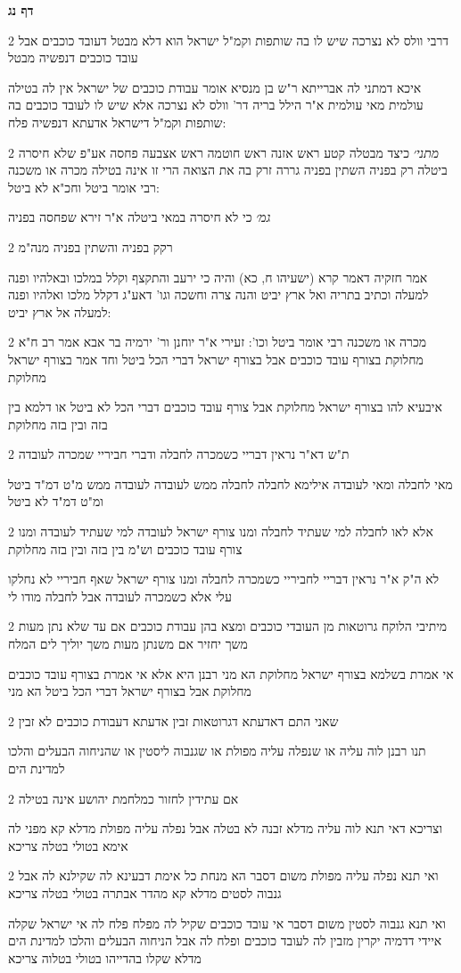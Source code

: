 \documentclass[12pt, openany]{book}
\newcommand{\sethebfont}{
\fontsize{10.5pt}{21.0pt} \selectfont
}
\newcommand{\twocol}[1]{
	{\sethebfont \begin{multicols}{2}
			#1
	\end{multicols}}	
}
\newcommand{\sectname}{}
\newcommand{\newsection}[1]{
	\addcontentsline{toc}{section}{#1}
	\renewcommand{\sectname}{#1}	
	\vspace{-\baselineskip}
	\begin{center}
		\textbf{%
\fontsize{16pt}{16pt}\selectfont
			#1}
	\end{center}
	\vspace{-\baselineskip}
	\nopagebreak
}
\begin{document}
\newsection{דף נג}
\twocol{דרבי וולס לא נצרכה שיש לו בה שותפות וקמ"ל ישראל הוא דלא מבטל דעובד כוכבים אבל עובד כוכבים דנפשיה מבטל
\par איכא דמתני לה אברייתא ר"ש בן מנסיא אומר עבודת כוכבים של ישראל אין לה בטילה עולמית מאי עולמית א"ר הילל בריה דר' וולס לא נצרכה אלא שיש לו לעובד כוכבים בה שותפות וקמ"ל דישראל אדעתא דנפשיה פלח:}
\twocol{{\large\emph{מתני׳}} כיצד מבטלה קטע ראש אזנה ראש חוטמה ראש אצבעה פחסה אע"פ שלא חיסרה ביטלה רק בפניה השתין בפניה גררה זרק בה את הצואה הרי זו אינה בטילה מכרה או משכנה רבי אומר ביטל וחכ"א לא ביטל:
\par {\large\emph{גמ׳}} כי לא חיסרה במאי ביטלה א"ר זירא שפחסה בפניה}
\twocol{רקק בפניה והשתין בפניה מנה"מ
\par אמר חזקיה דאמר קרא (ישעיהו ח, כא) והיה כי ירעב והתקצף וקלל במלכו ובאלהיו ופנה למעלה וכתיב בתריה ואל ארץ יביט והנה צרה וחשכה וגו' דאע"ג דקלל מלכו ואלהיו ופנה למעלה אל ארץ יביט:}
\twocol{מכרה או משכנה רבי אומר ביטל וכו': זעירי א"ר יוחנן ור' ירמיה בר אבא אמר רב ח"א מחלוקת בצורף עובד כוכבים אבל בצורף ישראל דברי הכל ביטל וחד אמר בצורף ישראל מחלוקת
\par איבעיא להו בצורף ישראל מחלוקת אבל צורף עובד כוכבים דברי הכל לא ביטל או דלמא בין בזה ובין בזה מחלוקת}
\twocol{ת"ש דא"ר נראין דבריי כשמכרה לחבלה ודברי חביריי שמכרה לעובדה
\par מאי לחבלה ומאי לעובדה אילימא לחבלה לחבלה ממש לעובדה לעובדה ממש מ"ט דמ"ד ביטל ומ"ט דמ"ד לא ביטל}
\twocol{אלא לאו לחבלה למי שעתיד לחבלה ומנו צורף ישראל לעובדה למי שעתיד לעובדה ומנו צורף עובד כוכבים וש"מ בין בזה ובין בזה מחלוקת
\par לא ה"ק א"ר נראין דבריי לחביריי כשמכרה לחבלה ומנו צורף ישראל שאף חביריי לא נחלקו עלי אלא כשמכרה לעובדה אבל לחבלה מודו לי}
\twocol{מיתיבי הלוקח גרוטאות מן העובדי כוכבים ומצא בהן עבודת כוכבים אם עד שלא נתן מעות משך יחזיר אם משנתן מעות משך יוליך לים המלח
\par אי אמרת בשלמא בצורף ישראל מחלוקת הא מני רבנן היא אלא אי אמרת בצורף עובד כוכבים מחלוקת אבל בצורף ישראל דברי הכל ביטל הא מני}
\twocol{שאני התם דאדעתא דגרוטאות זבין אדעתא דעבודת כוכבים לא זבין
\par תנו רבנן לוה עליה או שנפלה עליה מפולת או שגנבוה ליסטין או שהניחוה הבעלים והלכו למדינת הים}
\twocol{אם עתידין לחזור כמלחמת יהושע אינה בטילה
\par וצריכא דאי תנא לוה עליה מדלא זבנה לא בטלה אבל נפלה עליה מפולת מדלא קא מפני לה אימא בטולי בטלה צריכא}
\twocol{ואי תנא נפלה עליה מפולת משום דסבר הא מנחת כל אימת דבעינא לה שקילנא לה אבל גנבוה לסטים מדלא קא מהדר אבתרה בטולי בטלה צריכא
\par ואי תנא גנבוה לסטין משום דסבר אי עובד כוכבים שקיל לה מפלח פלח לה אי ישראל שקלה איידי דדמיה יקרין מזבין לה לעובד כוכבים ופלח לה אבל הניחוה הבעלים והלכו למדינת הים מדלא שקלו בהדייהו בטולי בטלוה צריכא}
\end{document}
